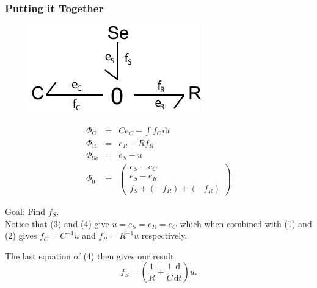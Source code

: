 \documentclass[11pt,reqno]{beamer}
\newcommand{\D}[2]{\frac{\mathrm{d} #1}{\mathrm{d} #2}}
\newcommand{\df}[1]{\mspace{2mu}  \mathrm{d}#1}
\begin{document}
\begin{frame}
\frametitle{Putting it Together}
\begin{small}
\begin{minipage}{0.4\textwidth}
\begin{figure}
	\includegraphics[width=\textwidth]{RC_bondgraph.pdf}
\end{figure}
\end{minipage}
\begin{minipage}{0.57\textwidth}
\begin{eqnarray}
\Phi_\text{C} &=& Ce_C - \int f_C \df{t}\\
\Phi_\text{R} &=& e_R - Rf_R\\
\Phi_\text{Se} & =& e_S - u\\
\Phi_\text{0} &=&
\left(\begin{matrix}
e_S  - e_C\\
e_S - e_R\\
f_S  + (- f_R) +  (-f_R)
\end{matrix}\right)
\end{eqnarray}
\end{minipage}
Goal: Find $f_S$.\\
Notice that (3) and (4) give $u = e_S =e_R = e_C$ which when combined with (1) and (2) gives $f_C = C^{-1}\dot{u}$ and $f_R = R^{-1}u$ respectively.\\
\vspace{5pt}

The last equation of (4) then gives our result:
\[
f_S = \left(\frac{1}{R} + \frac{1}{C}\D{}{t}\right)u.
\]
\end{small}
\end{frame}
\end{document}
